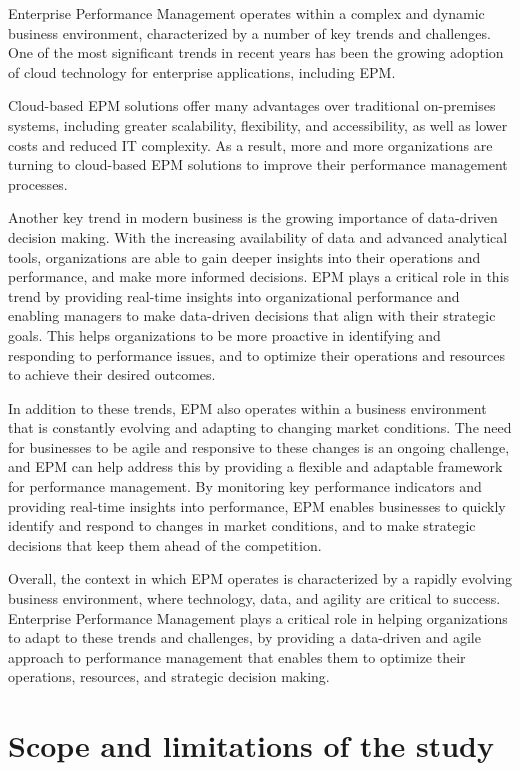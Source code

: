 \documentclass[12pt,a4paper,openright,twoside]{book}
\begin{document}
Enterprise Performance Management operates within a complex and dynamic business environment, characterized by a number of key trends and challenges. 
%
One of the most significant trends in recent years has been the growing adoption of cloud technology for enterprise applications, including EPM. 

Cloud-based EPM solutions offer many advantages over traditional on-premises systems, including greater scalability, flexibility, and accessibility, as well as lower costs and reduced IT complexity. 
%
As a result, more and more organizations are turning to cloud-based EPM solutions to improve their performance management processes.

Another key trend in modern business is the growing importance of data-driven decision making. 
%
With the increasing availability of data and advanced analytical tools, organizations are able to gain deeper insights into their operations and performance, and make more informed decisions. 
%
EPM plays a critical role in this trend by providing real-time insights into organizational performance and enabling managers to make data-driven decisions that align with their strategic goals. 
%
This helps organizations to be more proactive in identifying and responding to performance issues, and to optimize their operations and resources to achieve their desired outcomes.

In addition to these trends, EPM also operates within a business environment that is constantly evolving and adapting to changing market conditions. 
%
The need for businesses to be agile and responsive to these changes is an ongoing challenge, and EPM can help address this by providing a flexible and adaptable framework for performance management. 
%
By monitoring key performance indicators and providing real-time insights into performance, EPM enables businesses to quickly identify and respond to changes in market conditions, and to make strategic decisions that keep them ahead of the competition.

Overall, the context in which EPM operates is characterized by a rapidly evolving business environment, where technology, data, and agility are critical to success. 
%
Enterprise Performance Management plays a critical role in helping organizations to adapt to these trends and challenges, by providing a data-driven and agile approach to performance management that enables them to optimize their operations, resources, and strategic decision making.

\section{Scope and limitations of the study}
\end{document}
